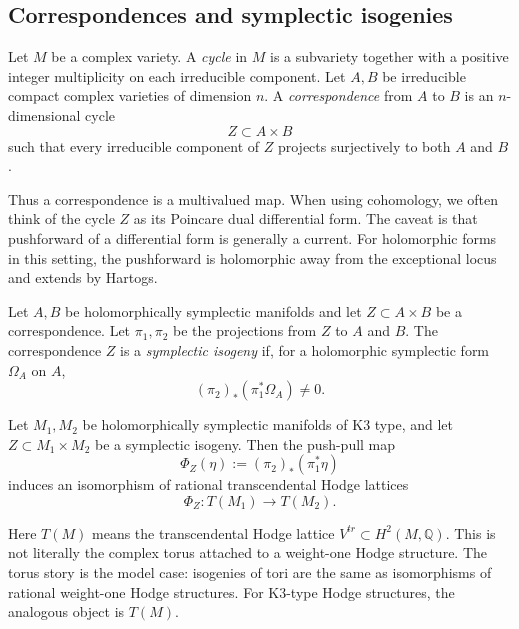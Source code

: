 \subsection{Correspondences and symplectic
isogenies}
\label{subsection-correspondences-symplectic-isogenies}

\begin{definition}
\label{definition-correspondence-verbitsky}
Let $M$ be a complex variety.
A {\it cycle} in $M$ is a subvariety
together with a positive integer
multiplicity on each irreducible component.
Let $A,B$ be irreducible compact complex
varieties of dimension $n$.
A {\it correspondence} from $A$ to $B$ is an
$n$-dimensional cycle
$$
Z\subset A\times B
$$
such that every irreducible component of
$Z$ projects surjectively to both $A$ and
$B$.
\end{definition}

\noindent
Thus a correspondence is a multivalued map.
When using cohomology, we often think of the
cycle $Z$ as its Poincare dual differential
form. The caveat is that pushforward of a
differential form is generally a current.
For holomorphic forms in this setting, the
pushforward is holomorphic away from the
exceptional locus and extends by Hartogs.

\begin{definition}
\label{definition-symplectic-isogeny}
Let $A,B$ be holomorphically symplectic
manifolds and let
$Z\subset A\times B$ be a correspondence.
Let $\pi_1,\pi_2$ be the projections from
$Z$ to $A$ and $B$.
The correspondence $Z$ is a
{\it symplectic isogeny} if, for a
holomorphic symplectic form $\Omega_A$ on
$A$,
$$
(\pi_2)_*(\pi_1^*\Omega_A)\neq 0.
$$
\end{definition}

\begin{lemma}
\label{lemma-sympl-isog-transcendental}
Let $M_1,M_2$ be holomorphically symplectic
manifolds of K3 type, and let
$Z\subset M_1\times M_2$ be a symplectic
isogeny.
Then the push-pull map
$$
\Phi_Z(\eta):=(\pi_2)_*(\pi_1^*\eta)
$$
induces an isomorphism of rational
transcendental Hodge lattices
$$
\Phi_Z:T(M_1)\longrightarrow T(M_2).
$$
\end{lemma}

\noindent
Here $T(M)$ means the transcendental Hodge
lattice $V^{tr}\subset H^2(M,\mathbb{Q})$.
This is not literally the complex torus
attached to a weight-one Hodge structure.
The torus story is the model case: isogenies
of tori are the same as isomorphisms of
rational weight-one Hodge structures.
For K3-type Hodge structures, the analogous
object is $T(M)$.


